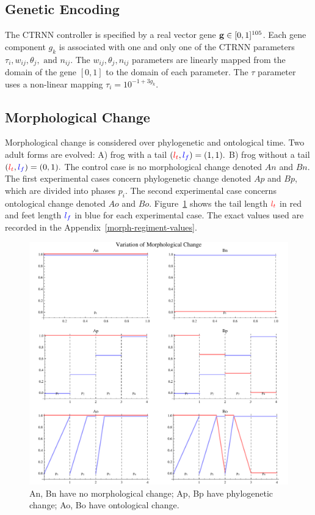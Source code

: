 \subsection{Genetic Encoding}

The CTRNN controller is specified by a real vector gene $\mathbf{g} \in [0,
  1]^{105}$.  Each gene component $g_k$ is associated with one and
only one of the CTRNN parameters $\tau_i, w_{ij}, \theta_j, \text{ and }
n_{ij}$.  The $w_{ij}, \theta_j, n_{ij}$ parameters are linearly
mapped from the domain of the gene $[0,1]$ to the domain of each
parameter.  The $\tau$ parameter uses a non-linear mapping $\tau_i =
10^{-1 + 3 g_k}$.  

\subsection{Morphological Change}

Morphological change is considered over phylogenetic and ontological
time.  Two adult forms are evolved: A) frog with a tail $(\color{red}l_t\color{black},
\color{blue}l_f\color{black}) = (1,1).$ B) frog without a tail $(\color{red}l_t\color{black}, \color{blue}l_f\color{black}) =
(0,1).$ The control case is no morphological change denoted $An$ and
$Bn$.  The first experimental cases concern phylogenetic change
denoted $Ap$ and $Bp$, which are divided into phases $p_i$.  The
second experimental case concerns ontological change denoted $Ao$ and
$Bo$.  Figure~\ref{morph-regiment} shows the tail length $\color{red}l_t\color{black}$ in
red and feet length $\color{blue}l_f\color{black}$ in blue for each experimental case.
The exact values used are recorded in the
Appendix~\ref{morph-regiment-values}.

\begin{figure}
  \begin{center} 
    \includegraphics[scale=0.7]{fig/morph-regiment.pdf} 
  \end{center} 
  \caption[Variations of morphological change]{An, Bn have no
    morphological change; Ap, Bp have phylogenetic change; Ao, Bo have
    ontological change.}
  \label{morph-regiment}
\end{figure}

